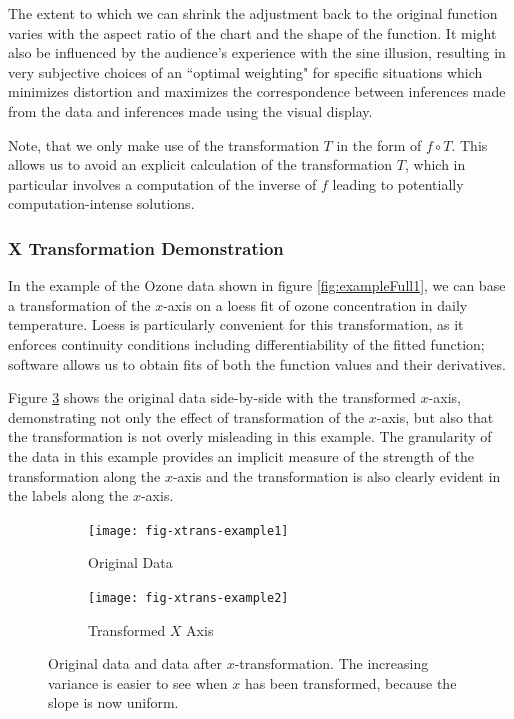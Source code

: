 \documentclass[11pt]{isuthesis}\usepackage[]{graphicx}\usepackage[]{color}
\begin{document}
The extent  to which we can shrink the adjustment back to the original function  varies with the aspect ratio of the chart and the shape of the function. It might also be influenced by the audience's experience with the sine illusion, resulting in very subjective choices of an ``optimal weighting" for specific situations which minimizes distortion and maximizes the correspondence between inferences made from the data and inferences made using the visual display.


Note, that we only make use of the transformation $T$ in the form of $f \circ T$. This allows us to avoid an explicit calculation of the transformation $T$, which in particular  involves a computation of the inverse of $f$ leading to potentially computation-intense solutions. 
\subsubsection{X Transformation Demonstration}


In the example of the Ozone data shown in figure \ref{fig:exampleFull1}, we can base a transformation of the $x$-axis on a loess fit of ozone concentration in daily temperature. Loess is particularly convenient for this transformation, as it enforces continuity conditions including differentiability of the fitted function; software allows us to obtain fits of both the function values and their derivatives.

Figure \ref{fig:xtrans-example} shows the original data side-by-side with the transformed $x$-axis, demonstrating not only the effect of transformation of the $x$-axis, but also that the transformation is not overly misleading in this example. The granularity of the data in this example provides an implicit measure of the strength of the transformation along the $x$-axis and the transformation is also clearly evident in the labels along the $x$-axis. 
%
\begin{figure}[h!]\centering
\begin{subfigure}[b]{.48\textwidth}\centering
\texttt{[image: fig-xtrans-example1]}
\caption{Original Data}\label{fig:xtrans-example-original}
\end{subfigure}
\begin{subfigure}[b]{.48\textwidth}\centering
\texttt{[image: fig-xtrans-example2]}
\caption{Transformed $X$ Axis}\label{fig:xtrans-example-trans}
\end{subfigure}
\caption[Original data and data after X transformation]{Original data and data after $x$-transformation. The increasing variance is easier to see when $x$ has been transformed, because the slope is now uniform.\label{fig:xtrans-example}}
\end{figure}
\end{document}
